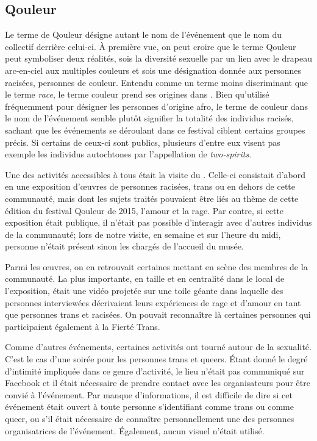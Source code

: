 \subsection{Qouleur}
\label{subsec:qouleur}
Le terme de Qouleur désigne autant le nom de l'événement que le nom du collectif derrière celui-ci.
À première vue, on peut croire que le terme Qouleur peut symboliser deux réalités, sois la diversité sexuelle par un lien avec le drapeau arc-en-ciel aux multiples couleurs et sois une désignation donnée aux personnes racisées, personnes de couleur.
Entendu comme un terme moins discriminant que le terme \emph{race}, le terme couleur prend ses origines dans .
Bien qu'utilisé fréquemment pour désigner les personnes d'origine afro, le terme de couleur dans le nom de l'événement semble plutôt signifier la totalité des individus racisés, sachant que les événements se déroulant dans ce festival ciblent certains groupes précis.
Si certains de ceux-ci sont publics, plusieurs d'entre eux visent pas exemple les individus autochtones par l'appellation de \emph{two-spirits}.

Une des activités accessibles à tous était la visite du \mai{}.
Celle-ci consistait d'abord en une exposition d'œuvres de personnes racisées, trans ou en dehors de cette communauté, mais dont les sujets traités pouvaient être liés au thème de cette édition du festival Qouleur de 2015, l'amour et la rage.
Par contre, si cette exposition était publique, il n'était pas possible d'interagir avec d'autres individus de la communauté; lors de notre visite, en semaine et sur l'heure du midi, personne n'était présent sinon les chargés de l'accueil du musée.

Parmi les œuvres, on en retrouvait certaines mettant en scène des membres de la communauté.
La plus importante, en taille et en centralité dans le local de l'exposition, était une vidéo projetée sur une toile géante dans laquelle des personnes interviewées décrivaient leurs expériences de rage et d'amour en tant que personnes trans et racisées.
On pouvait reconnaître là certaines personnes qui participaient également à la Fierté Trans.

Comme d'autres événements, certaines activités ont tourné autour de la sexualité.
C'est le cas d'une soirée \bdsm{} pour les personnes trans et queers.
Étant donné le degré d'intimité impliquée dans ce genre d'activité, le lieu n'était pas communiqué sur Facebook et il était nécessaire de prendre contact avec les organisateurs pour être convié à l'événement.
Par manque d'informations, il est difficile de dire si cet événement était ouvert à toute personne s'identifiant comme trans ou comme queer, ou s’il était nécessaire de connaître personnellement une des personnes organisatrices de l'événement.
Également, aucun visuel n'était utilisé.

